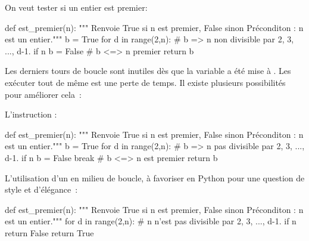 

On veut tester si un entier  est premier:


\begin{pyverbatim}
def est_premier(n):
    """ Renvoie True si n est premier, False sinon
        Préconditon : n est un entier."""
    b = True
    for d in range(2,n):
        # b => n non divisible par 2, 3, ..., d-1.
        if n %
            b = False
    # b <=> n premier
    return b
\end{pyverbatim}

\begin{rem}
Les derniers tours de boucle sont inutiles dès que la
variable  a été mise à . Les exécuter tout de même est une perte de temps. Il 
existe plusieurs possibilités pour améliorer cela~:

\end{rem}

L'instruction  :
\begin{pyverbatim}
def est_premier(n):
    """ Renvoie True si n est premier, False sinon
        Préconditon : n est un entier."""
    b = True
    for d in range(2,n):
        # b => n pas divisible par 2, 3, ..., d-1.
        if n %
            b = False
            break
    # b <=> n est premier
    return b
\end{pyverbatim}

L'utilisation d'un  en milieu de boucle, à favoriser en Python{} pour 
une question de style et d'élégance~:

\begin{pyverbatim}
def est_premier(n):
    """ Renvoie True si n est premier, False sinon
        Préconditon : n est un entier."""
    for d in range(2,n):
        # n n'est pas divisible par 2, 3, ..., d-1.
        if n %
            return False
    return True
\end{pyverbatim}